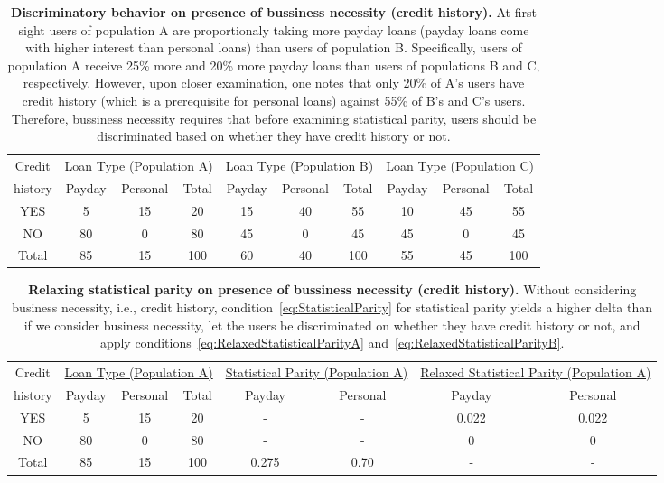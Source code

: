 \begin{table*}[t]
{ \small
  \center
  \renewcommand{\arraystretch}{1.5}
  \begin{tabular}{ c | c c c | c c c | c c c}
    Credit
    & \multicolumn{3}{|c|}{\underline{Loan Type (Population A)}}
    & \multicolumn{3}{|c}{\underline{Loan Type (Population B) }}
    & \multicolumn{3}{|c}{\underline{Loan Type (Population C) }} \\
    history & Payday & Personal & Total & Payday & Personal & Total & Payday & Personal & Total \\
    \hline
    YES & 5  & 15 & 20 & 15 & 40 & 55 & 10 & 45 & 55 \\
    NO  & 80 & 0  & 80 & 45 & 0 & 45 & 45 & 0 & 45\\
    \hline
    Total & 85 & 15 & 100 & 60 & 40 & 100 & 55 & 45 & 100\\
  \end{tabular}
  \caption{{\bf Discriminatory behavior on presence of bussiness necessity (credit history).}
    At first sight users of population A are proportionaly taking more payday loans
    (payday loans come with higher interest than personal loans) than users of population B.
    Specifically, users of population A receive 25\% more and 20\% more  payday loans than
    users of populations B and C, respectively. However, upon closer examination, one notes
    that only 20\% of A's users have credit history (which is a prerequisite for personal
    loans) against 55\% of B's and C's users. Therefore, bussiness necessity requires that
    before examining statistical parity, users should be discriminated based on whether
    they have credit history or not.
  }
  \label{tab:BusinessNessecityA}
}
\end{table*}

\begin{table*}[t]
{ \small
  \center
  \renewcommand{\arraystretch}{1.5}
  \begin{tabular}{ c | c c c | c c | c c}
    Credit
    & \multicolumn{3}{|c|}{\underline{Loan Type (Population A)}}
    & \multicolumn{2}{|c}{\underline{Statistical Parity (Population A) }}
    & \multicolumn{2}{|c}{\underline{Relaxed Statistical Parity (Population A) }} \\
    history & Payday & Personal & Total & Payday & Personal & Payday & Personal \\
    \hline
    YES & 5  & 15 & 20 & - & - &  0.022 & 0.022 \\
    NO  & 80 & 0  & 80 & - & - &  0    & 0 \\
    \hline
    Total & 85 & 15 & 100 & 0.275 & 0.70 & - & - \\
  \end{tabular}
  \caption{{\bf Relaxing statistical parity on presence of bussiness necessity (credit history).}
    Without considering business necessity, i.e., credit history,
    condition~\ref{eq:StatisticalParity} for statistical parity yields a higher delta than if we
    consider business necessity, let the users be discriminated on whether they have credit
    history or not, and apply conditions~\ref{eq:RelaxedStatisticalParityA}
    and~\ref{eq:RelaxedStatisticalParityB}.
  }
  \label{tab:BusinessNessecityB}
}
\end{table*}

